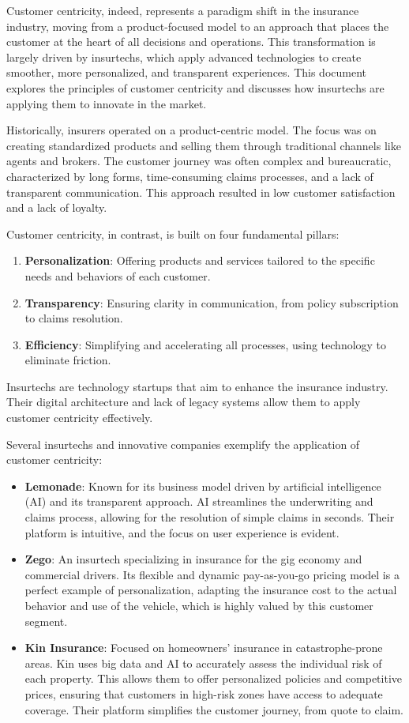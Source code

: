 \documentclass{article}
\begin{document}
Customer centricity, indeed, represents a paradigm shift in the insurance industry, moving from a product-focused model to an approach that places the customer at the heart of all decisions and operations. This transformation is largely driven by insurtechs, which apply advanced technologies to create smoother, more personalized, and transparent experiences. This document explores the principles of customer centricity and discusses how insurtechs are applying them to innovate in the market.


Historically, insurers operated on a product-centric model. The focus was on creating standardized products and selling them through traditional channels like agents and brokers. The customer journey was often complex and bureaucratic, characterized by long forms, time-consuming claims processes, and a lack of transparent communication. This approach resulted in low customer satisfaction and a lack of loyalty.


Customer centricity, in contrast, is built on four fundamental pillars:
\begin{enumerate}
\item \textbf{Personalization}: Offering products and services tailored to the specific needs and behaviors of each customer.
\item \textbf{Transparency}: Ensuring clarity in communication, from policy subscription to claims resolution.
\item \textbf{Efficiency}: Simplifying and accelerating all processes, using technology to eliminate friction.
\end{enumerate}


Insurtechs are technology startups that aim to enhance the insurance industry. Their digital architecture and lack of legacy systems allow them to apply customer centricity effectively.


Several insurtechs and innovative companies exemplify the application of customer centricity:
\begin{itemize}
\item \textbf{Lemonade}: Known for its business model driven by artificial intelligence (AI) and its transparent approach. AI streamlines the underwriting and claims process, allowing for the resolution of simple claims in seconds. Their platform is intuitive, and the focus on user experience is evident.
\item \textbf{Zego}: An insurtech specializing in insurance for the gig economy and commercial drivers. Its flexible and dynamic pay-as-you-go pricing model is a perfect example of personalization, adapting the insurance cost to the actual behavior and use of the vehicle, which is highly valued by this customer segment.
\item \textbf{Kin Insurance}: Focused on homeowners' insurance in catastrophe-prone areas. Kin uses big data and AI to accurately assess the individual risk of each property. This allows them to offer personalized policies and competitive prices, ensuring that customers in high-risk zones have access to adequate coverage. Their platform simplifies the customer journey, from quote to claim.
\end{itemize}
\end{document}
